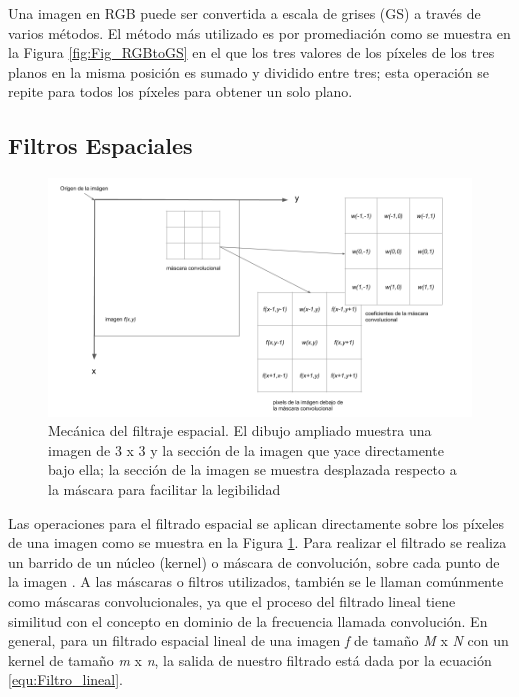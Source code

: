 \begin{onehalfspacing}
Una imagen en RGB puede ser convertida a escala de grises (GS) a través de varios métodos. El método más utilizado es por promediación como se muestra en la Figura \ref{fig:Fig_RGBtoGS} en el que los tres valores de los píxeles de los tres planos en la misma posición es sumado y dividido entre tres; esta operación se repite para todos los píxeles para obtener un solo plano.

\subsection{Filtros Espaciales}
\label{Filtros_espaciales}

\begin{figure}[th]
	\centering
	\includegraphics[width=13cm,keepaspectratio]{XX_Figures/Fig4_Convolucion.png}
	\caption{\footnotesize Mecánica del filtraje espacial. El dibujo ampliado muestra una imagen de 3 x 3 y la sección de la imagen que yace directamente bajo ella; la sección de la imagen se muestra desplazada respecto a la máscara para facilitar la legibilidad \cite{GonzalezDigitalProcessing.pdf}}
	\label{fig:Fig4_Convolucion}
\end{figure}

Las operaciones para el filtrado espacial se aplican directamente sobre los píxeles de una imagen como se muestra en la Figura \ref{fig:Fig4_Convolucion}. Para realizar el filtrado  se realiza un barrido de un núcleo (kernel) o máscara de convolución, sobre cada punto de la imagen \cite{GonzalezDigitalProcessing.pdf}. A las máscaras o filtros utilizados, también se le llaman comúnmente como máscaras convolucionales, ya que el proceso del filtrado lineal tiene similitud con el concepto en dominio de la frecuencia llamada convolución. En general, para un filtrado espacial lineal de una imagen \textit{f} de tamaño \textit{M} x \textit{N} con un kernel de tamaño \textit{m} x \textit{n}, la salida de nuestro filtrado está dada por la ecuación \ref{equ:Filtro_lineal}.


\end{onehalfspacing}
